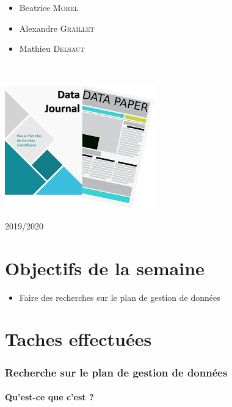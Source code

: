 \documentclass[14pt,oneside]{article}
\begin{document}
\begin{titlepage}
\begin{minipage}{0.45\textwidth}
\begin{flushright}
\begin{itemize}[font=\color{amber} \Large, label=, leftmargin=3.5cm]
\item{Beatrice \textsc{Morel}}
\item{Alexandre \textsc{Graillet}}
\item{Mathieu \textsc{Delsaut}}
\end{itemize}

\end{flushright}
\end{minipage}\\[0cm]
\vspace{2 cm}
\begin{center}
\includegraphics[scale=1]{1.png} 
\end{center}
\vspace{1cm}

\begin{center}
2019/2020
\end{center}
\vfill
\end{titlepage}


\newpage
\part*{Objectifs de la semaine}
\begin{itemize}
	\item Faire des recherches sur le plan de gestion de données
\end{itemize}



\part*{Taches effectuées}
\section*{Recherche sur le plan de gestion de données}
\subsection*{Qu'est-ce que c'est ?}
\end{document}
